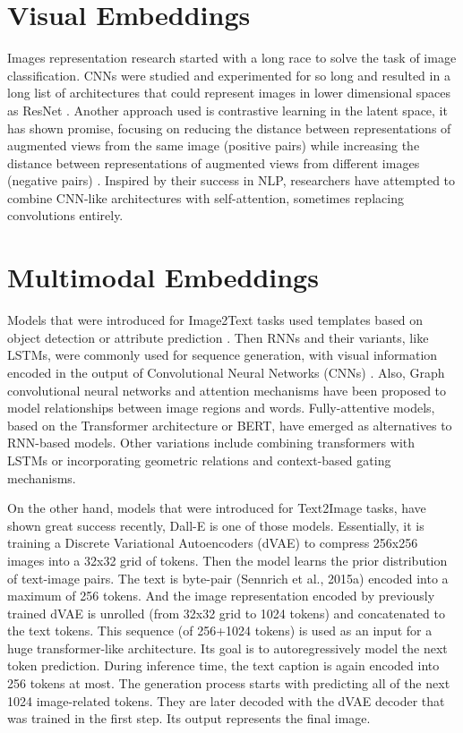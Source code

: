 \documentclass[11pt,a4paper]{article}
\begin{document}
\section{Visual Embeddings}
Images representation research started with a long race to solve the task of image classification. CNNs were studied and experimented for so long and resulted in a long list of architectures that could represent images in lower dimensional spaces as ResNet \cite{he2015deep}.
Another approach used is contrastive learning in the latent space, it has shown promise, focusing on reducing the distance between representations of augmented views from the same image (positive pairs) while increasing the distance between representations of augmented views from different images (negative pairs) \cite{oord2019representation}.
Inspired by their success in NLP, researchers have attempted to combine CNN-like architectures with self-attention, sometimes replacing convolutions entirely.

\section{Multimodal Embeddings}
Models that were introduced for Image2Text tasks used templates based on object detection or attribute prediction \cite{inproceedings}. Then RNNs and their variants, like LSTMs, were commonly used for sequence generation, with visual information encoded in the output of Convolutional Neural Networks (CNNs) \cite{yao2018exploring}. Also, Graph convolutional neural networks and attention mechanisms have been proposed to model relationships between image regions and words. Fully-attentive models, based on the Transformer architecture or BERT, have emerged as alternatives to RNN-based models. Other variations include combining transformers with LSTMs or incorporating geometric relations and context-based gating mechanisms.

On the other hand, models that were introduced for Text2Image tasks, have shown great success recently, Dall-E \cite{ramesh2021zeroshot} is one of those models. Essentially, it is training a Discrete Variational Autoencoders (dVAE) to compress 256x256 images into a 32x32 grid of tokens. Then the model learns the prior distribution of text-image pairs. The text is byte-pair (Sennrich et al., 2015a) encoded into a maximum of 256 tokens. And the image representation encoded by previously trained dVAE is unrolled (from 32x32 grid to 1024 tokens) and concatenated to the text tokens. This sequence (of 256+1024 tokens) is used as an input for a huge transformer-like architecture. Its goal is to autoregressively model the next token prediction. During inference time, the text caption is again encoded into 256 tokens at most. The generation process starts with predicting all of the next 1024 image-related tokens. They are later decoded with the dVAE decoder that was trained in the first step. Its output represents the final image.
\end{document}
